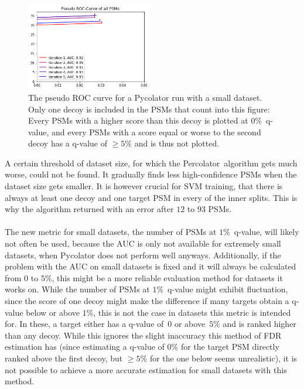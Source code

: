 \renewcommand{\baselinestretch}{0.9}
\begin{figure}
	\normalsize
	\centering
	\includegraphics[width = 0.49\textwidth]{figures/badPseudoROC.png}
	\caption[Pseudo ROC of very small datasets]{The pseudo ROC curve for a Pycolator run with a small dataset. Only one decoy is included in the PSMs that count into this figure: Every PSMs with a higher score than this decoy is plotted at $0\%$~q-value, and every PSMs with a score equal or worse to the second decoy has a q-value of $\geq5\%$ and is thus not plotted.}
	\label{fig:small_dataset_pseudo_ROC}
\end{figure}
\renewcommand{\baselinestretch}{1}
A certain threshold of dataset size, for which the Percolator~algorithm gets much worse, could not be found. It gradually finds less high-confidence PSMs when the dataset size gets smaller. It is however crucial for SVM training, that there is always at least one decoy and one target PSM in every of the inner splits. This is why the algorithm returned with an error after $12$ to $93$ PSMs.\\\\
The new metric for small datasets, the number of PSMs at $1\%$~q-value, will likely not often be used, because the AUC is only not available for extremely small datasets, when Pycolator does not perform well anyways. Additionally, if the problem with the AUC on small datasets is fixed and it will always be calculated from $0$ to $5\%$, this might be a more reliable evaluation method for datasets it works on. While the number of PSMs at $1\%$~q-value might exhibit fluctuation, since the score of one decoy might make the difference if many targets obtain a q-value below or above $1\%$, this is not the case in datasets this metric is intended for. In these, a target either has a q-value of~$0$ or above~$5\%$ and is ranked higher than any decoy. While this ignores the slight inaccuracy this method of FDR estimation has (since estimating a q-value of $0\%$ for the target PSM directly ranked above the first decoy, but $\geq5\%$ for the one below seems unrealistic), it is not possible to achieve a more accurate estimation for small datasets with this method.\\\\%

